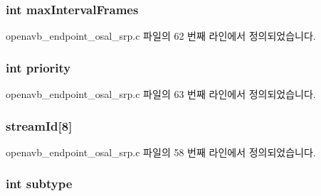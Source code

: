 \subsubsection[{\texorpdfstring{max\+Interval\+Frames}{maxIntervalFrames}}]{\setlength{\rightskip}{0pt plus 5cm}int max\+Interval\+Frames}\hypertarget{structstr_elem__t_a0a60e10f690833412bcbc076923a8420}{}\label{structstr_elem__t_a0a60e10f690833412bcbc076923a8420}


openavb\+\_\+endpoint\+\_\+osal\+\_\+srp.\+c 파일의 62 번째 라인에서 정의되었습니다.

\subsubsection[{\texorpdfstring{priority}{priority}}]{\setlength{\rightskip}{0pt plus 5cm}int priority}\hypertarget{structstr_elem__t_acec9ce2df15222151ad66fcb1d74eb9f}{}\label{structstr_elem__t_acec9ce2df15222151ad66fcb1d74eb9f}


openavb\+\_\+endpoint\+\_\+osal\+\_\+srp.\+c 파일의 63 번째 라인에서 정의되었습니다.

\subsubsection[{\texorpdfstring{stream\+Id}{streamId}}]{ stream\+Id\mbox{[}8\mbox{]}}\hypertarget{structstr_elem__t_a196eef9dc008c0d002814536cf5c960a}{}\label{structstr_elem__t_a196eef9dc008c0d002814536cf5c960a}


openavb\+\_\+endpoint\+\_\+osal\+\_\+srp.\+c 파일의 58 번째 라인에서 정의되었습니다.

\subsubsection[{\texorpdfstring{subtype}{subtype}}]{\setlength{\rightskip}{0pt plus 5cm}int subtype}\hypertarget{structstr_elem__t_a7aacd365cfc725fe569f28df862fa5eb}{}\label{structstr_elem__t_a7aacd365cfc725fe569f28df862fa5eb}


